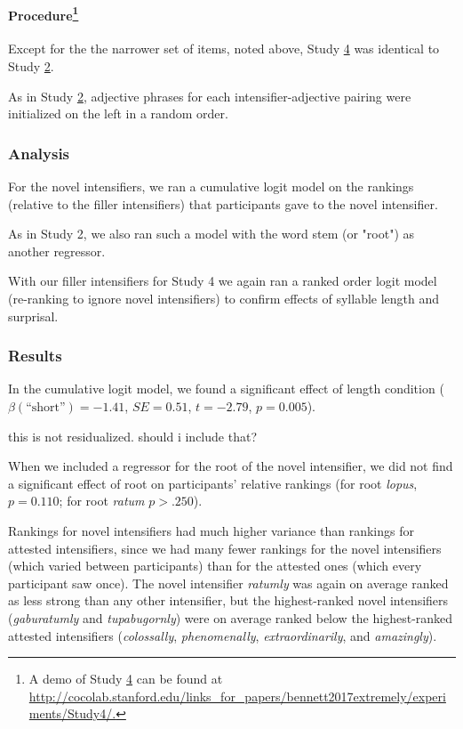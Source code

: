 \documentclass[10pt,letterpaper]{article}
\newcommand{\w}[1]{\emph{#1}}
\newcommand{\todo}[1]{{\color{red}#1}}
\begin{document}
\paragraph{Procedure\footnote{A demo of Study \hyperref[sec:study4]{4} can be found at \url{http://cocolab.stanford.edu/links_for_papers/bennett2017extremely/experiments/Study4/.}}}

Except for the the narrower set of items, noted above, Study \hyperref[sec:study4]{4} was identical to Study \hyperref[sec:study2]{2}. 

As in Study \hyperref[sec:study2]{2}, adjective phrases for each intensifier-adjective pairing were initialized on the left in a random order.

\subsubsection{Analysis}

For the novel intensifiers, we ran a cumulative logit model on the rankings (relative to the filler intensifiers) that participants gave to the novel intensifier.

As in Study 2, we also ran such a model with the word stem (or "root") as another regressor.

With our filler intensifiers for Study 4 we again ran a ranked order logit model (re-ranking to ignore novel intensifiers) to confirm effects of syllable length and surprisal.

\subsubsection{Results}

In the cumulative logit model, we found a significant effect of length condition ($\beta(\mbox{``short''})=-1.41$, $SE=0.51$, $t=-2.79$, $p=0.005$).

\todo{this is not residualized. should i include that?}

When we included a regressor for the root of the novel intensifier, we did not find a significant effect of root on participants' relative rankings (for root \w{lopus}, $p=0.110$; for root \w{ratum} $p>.250$).

Rankings for novel intensifiers had much higher variance than rankings for attested intensifiers, since we had many fewer rankings for the novel intensifiers (which varied between participants) than for the attested ones (which every participant saw once). The novel intensifier \w{ratumly} was again on average ranked as less strong than any other intensifier, but the highest-ranked novel intensifiers (\w{gaburatumly} and \w{tupabugornly}) were on average ranked below the highest-ranked attested intensifiers (\w{colossally}, \w{phenomenally}, \w{extraordinarily}, and \w{amazingly}).
\end{document}
